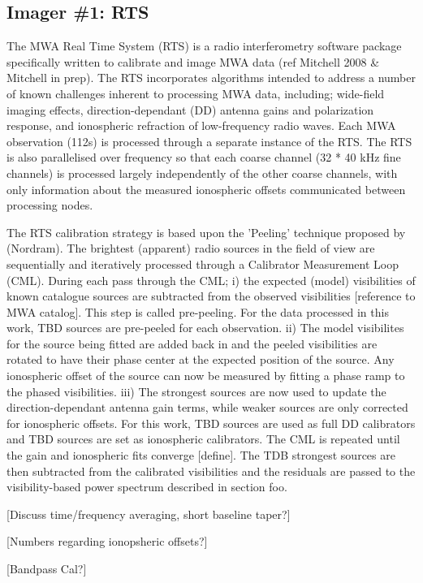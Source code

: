 \subsection{Imager \#1: RTS}
The MWA Real Time System (RTS) is a radio interferometry software package specifically written to calibrate and image MWA data (ref Mitchell 2008 & Mitchell in prep). The RTS incorporates algorithms intended to address a number of known challenges inherent to processing MWA data, including; wide-field imaging effects, direction-dependant (DD) antenna gains and polarization response, and ionospheric refraction of low-frequency radio waves. Each MWA observation (112s) is processed through a separate instance of the RTS. The RTS is also parallelised over frequency so that each coarse channel (32 * 40 kHz fine channels) is processed largely independently of the other coarse channels, with only information about the measured ionospheric offsets communicated between processing nodes.  

The RTS calibration strategy is based upon the 'Peeling' technique proposed by (Nordram). The brightest (apparent) radio sources in the field of view are sequentially and iteratively processed through a Calibrator Measurement Loop (CML). During each pass through the CML; i) the expected (model) visibilities of known catalogue sources are subtracted from the observed visibilities [reference to MWA catalog]. This step is called pre-peeling. For the data processed in this work, TBD sources are pre-peeled for each observation. ii) The model visibilites for the source being fitted are added back in and the peeled visibilities are rotated to have their phase center at the expected position of the source. Any ionospheric offset of the source can now be measured by fitting a phase ramp to the phased visibilities. iii) The strongest sources are now used to update the direction-dependant antenna gain terms, while weaker sources are only corrected for ionospheric offsets. For this work, TBD sources are used as full DD calibrators and TBD sources are set as ionospheric calibrators. The CML is repeated until the gain and ionospheric fits converge [define]. The TDB strongest sources are then subtracted from the calibrated visibilities and the residuals are passed to the visibility-based power spectrum described in section foo.

[Discuss time/frequency averaging, short baseline taper?]

[Numbers regarding ionopsheric offsets?]

[Bandpass Cal?]

